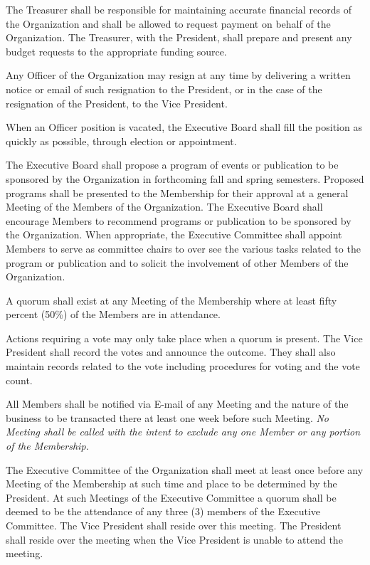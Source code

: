 \documentclass[12pt]{constitution}
\begin{document}
The Treasurer shall be responsible for maintaining accurate financial records of the Organization and shall be allowed to request payment on behalf of the Organization.
The Treasurer, with the President, shall prepare and present any budget requests to the appropriate funding source.


Any Officer of the Organization may resign at any time by delivering a written notice or email of such resignation to the President, or in the case of the resignation of the President, to the Vice President.

When an Officer position is vacated, the Executive Board shall fill the position as quickly as possible, through election or appointment.


The Executive Board shall propose a program of events or publication to be sponsored by the Organization in forthcoming fall and spring semesters.
Proposed programs shall be presented to the Membership for their approval at a general Meeting of the Members of the Organization. 
The Executive Board shall encourage Members to recommend programs or publication to be sponsored by the Organization. 
When appropriate, the Executive Committee shall appoint Members to serve as committee chairs to over see the various tasks related to the program or publication and to solicit the involvement of other Members of the Organization.


A quorum shall exist at any Meeting of the Membership where at least fifty percent (50\%) of the Members are in attendance.

Actions requiring a vote may only take place when a quorum is present.
The Vice President shall record the votes and announce the outcome.
They shall also maintain records related to the vote including procedures for voting and the vote count.

All Members shall be notified via E-mail of any Meeting and the nature of the business to be transacted there at least one week before such Meeting. 
\emph{No Meeting shall be called with the intent to exclude any one Member or any portion of the Membership.}

The Executive Committee of the Organization shall meet at least once before any Meeting of the Membership at such time and place to be determined by the President. 
At such Meetings of the Executive Committee a quorum shall be deemed to be the attendance of any three (3) members of the Executive Committee.
The Vice President shall reside over this meeting. 
The President shall reside over the meeting when the Vice President is unable to attend the meeting.
\end{document}
